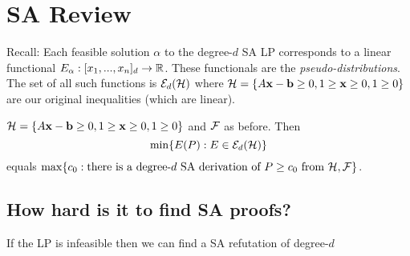 



\section{SA Review}
Recall: Each feasible solution $\alpha$ to the degree-$d$ SA LP corresponds to a linear functional $E_{\alpha}: [x_1, ..., x_n]_d \rightarrow \mathbb{R}$. These functionals are the \emph{pseudo-distributions}. The set of all such functions is $\mathcal{E}_d(\mathcal{H})$ where $\mathcal{H} = \{A\mathbf{x} - \mathbf{b} \geq 0, 1 \geq \mathbf{x} \geq 0, 1 \geq 0\}$ are our original inequalities (which are linear). 

\begin{lemma}
$\mathcal{H} = \{A\mathbf{x} - \mathbf{b} \geq 0, 1 \geq \mathbf{x} \geq 0, 1 \geq 0\}$ and $\mathcal{F}$ as before. Then 
\[\min \{E(P): E \in \mathcal{E}_d(\mathcal{H})\}\]
equals $\max\{c_0: \mbox{there is a degree-$d$ SA derivation of $P \geq c_0$ from }\mathcal{H}, \mathcal{F}\}$.
\end{lemma}

\subsection{How hard is it to find SA proofs?}
If the LP is infeasible then we can find a SA refutation of degree-$d$ 

